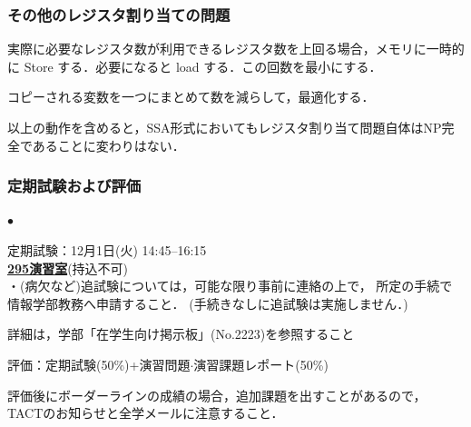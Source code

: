 \documentclass[ckj,dvipdfmx]{beamer}
\begin{document}
\begin{frame}
\frametitle{その他のレジスタ割り当ての問題}
\begin{list}{}{}
    \item[レジスタスピル最適化：] 実際に必要なレジスタ数が利用できるレジスタ数を上回る場合，メモリに一時的に Store する．必要になると load する．この回数を最小にする．
    

    \item[コアレッシング(Coalescing)最適化：]
    コピーされる変数を一つにまとめて数を減らして，最適化する．

\end{list}

以上の動作を含めると，SSA形式においてもレジスタ割り当て問題自体はNP完全であることに変わりはない．
\end{frame}


\begin{frame}
 \frametitle{定期試験および評価}

 \begin{list}%
  {$\bullet$} %
  {} %
  \item 定期試験：12月1日(火) 14:45--16:15\\
  \qquad \underline{\bf 295演習室}(持込不可)\\
	・{\small (病欠など)追試験については，可能な限り事前に連絡の上で，
  所定の手続で情報学部教務へ申請すること．
  (手続きなしに追試験は実施しません．)}

詳細は，学部「在学生向け掲示板」(No.2223)を参照すること

  \item 評価：定期試験(50\%)+演習問題$\cdot$演習課題レポート(50\%)\\
  \item 評価後にボーダーラインの成績の場合，追加課題を出すことがあるので，
  TACTのお知らせと全学メールに注意すること．
	 \end{list}
\end{frame}
\end{document}
